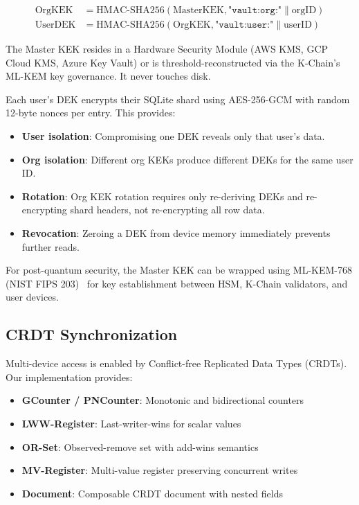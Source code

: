 \documentclass[twocolumn,11pt]{article}
\begin{document}
\begin{align}
\text{OrgKEK} &= \text{HMAC-SHA256}(\text{MasterKEK}, \texttt{"vault:org:"} \| \text{orgID}) \\
\text{UserDEK} &= \text{HMAC-SHA256}(\text{OrgKEK}, \texttt{"vault:user:"} \| \text{userID})
\end{align}

The Master KEK resides in a Hardware Security Module (AWS KMS, GCP Cloud KMS, Azure Key Vault) or is threshold-reconstructed via the K-Chain's ML-KEM key governance. It never touches disk.

Each user's DEK encrypts their SQLite shard using AES-256-GCM with random 12-byte nonces per entry. This provides:

\begin{itemize}
\item \textbf{User isolation}: Compromising one DEK reveals only that user's data.
\item \textbf{Org isolation}: Different org KEKs produce different DEKs for the same user ID.
\item \textbf{Rotation}: Org KEK rotation requires only re-deriving DEKs and re-encrypting shard headers, not re-encrypting all row data.
\item \textbf{Revocation}: Zeroing a DEK from device memory immediately prevents further reads.
\end{itemize}

For post-quantum security, the Master KEK can be wrapped using ML-KEM-768 (NIST FIPS 203)~\cite{nist-mlkem} for key establishment between HSM, K-Chain validators, and user devices.

\subsection{CRDT Synchronization}

Multi-device access is enabled by Conflict-free Replicated Data Types (CRDTs). Our implementation provides:

\begin{itemize}
\item \textbf{GCounter / PNCounter}: Monotonic and bidirectional counters
\item \textbf{LWW-Register}: Last-writer-wins for scalar values
\item \textbf{OR-Set}: Observed-remove set with add-wins semantics
\item \textbf{MV-Register}: Multi-value register preserving concurrent writes
\item \textbf{Document}: Composable CRDT document with nested fields
\end{itemize}
\end{document}
